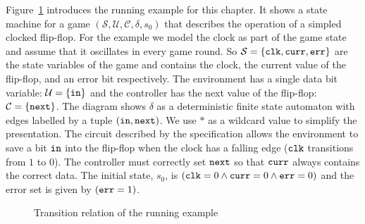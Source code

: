 Figure~\ref{fig:stratExample} introduces the running example for this chapter. It shows a state machine for a game $(\mathcal{S}, \mathcal{U}, \mathcal{C}, \delta, s_0)$ that describes the operation of a simpled clocked flip-flop. For the example we model the clock as part of the game state and assume that it oscillates in every game round. So $\mathcal{S} = \{ \texttt{clk}, \texttt{curr}, \texttt{err} \}$ are the state variables of the game and contains the clock, the current value of the flip-flop, and an error bit respectively. The environment has a single data bit variable: $\mathcal{U} = \{ \texttt{in} \}$ and the controller has the next value of the flip-flop: $\mathcal{C} = \{ \texttt{next} \}$. The diagram shows $\delta$ as a deterministic finite state automaton with edges labelled by a tuple $(\texttt{in}, \texttt{next})$. We use $*$ as a wildcard value to simplify the presentation. The circuit described by the specification allows the environment to save a bit $\texttt{in}$ into the flip-flop when the clock has a falling edge ($\texttt{clk}$ transitions from $1$ to $0$). The controller must correctly set $\texttt{next}$ so that $\texttt{curr}$ always contains the correct data. The initial state, $s_0$, is $(\texttt{clk} = 0 \land \texttt{curr} = 0 \land \texttt{err} = 0)$ and the error set is given by $(\texttt{err} = 1)$.


\begin{figure}
    \centering
    \caption{Transition relation of the running example}
    \label{fig:stratExample}
\end{figure}

